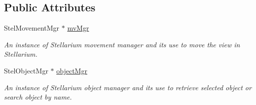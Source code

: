 \subsection*{Public Attributes}
\begin{DoxyCompactItemize}
\item 
Stel\+Movement\+Mgr $\ast$ \mbox{\hyperlink{class_autoscope_ab34124a1179a937ac061bb4fa3faa2de}{mv\+Mgr}}
\begin{DoxyCompactList}\small\item\em An instance of Stellarium movement manager and it\textquotesingle{}s use to move the view in Stellarium. \end{DoxyCompactList}\item 
Stel\+Object\+Mgr $\ast$ \mbox{\hyperlink{class_autoscope_aec2c452e45c0a7d045417a8656aa7c45}{object\+Mgr}}
\begin{DoxyCompactList}\small\item\em An instance of Stellarium object manager and it\textquotesingle{}s use to retrieve selected object or search object by name. \end{DoxyCompactList}\end{DoxyCompactItemize}

